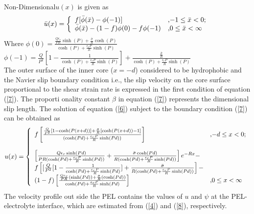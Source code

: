 \documentclass[11 pt]{article}
\begin{document}
Non-Dimensional$u(x)$ is given as
\begin{equation}
\bar u(x)=
 \left\{
                                \begin{array}{ll}
                                f[\bar \phi(\bar x)-\phi{(-1)}]  & \hbox{,$-1 \le \bar x <0$;} \\
                                 \bar \phi(\bar x)-(1-f)\phi{(0)}-f\phi{(-1)}            & \hbox{,$0 \le \bar x <\infty$} \\


\end{array}
\right.
\label{16}
\end{equation}
Where $ \phi(0)=\frac{\frac{Q\epsilon_{r}}{PR}\sinh(P)+\frac{\bar \sigma}{R}\cosh(P)}{\cosh(P)+\frac{\epsilon_{r}P}{R}\sinh(P)} $ \\
$\phi(-1)=\frac{Q}{{P}^{2}}[1-\frac{1}{\cosh(P)+\frac{\epsilon_{r}P}{R}\sinh(P)}] +\frac{\frac{\bar \sigma}{R}}{\cosh(P)+\frac{\epsilon_{r}P}{R}\sinh(P)} $ \\
The outer surface of the inner core ($x=-d$) considered to be hydrophobic  and  the Navier slip boundary condition i.e., the  slip velocity on the core surface  proportional to the shear strain rate is expressed in the first condition of equation  (\ref{7}). The proporti
onality constant $\beta$ in equation (\ref{7}) represents  the dimensional slip length. The solution of equation (\ref{6}) subject to the boundary condition (\ref{7}) can be obtained as
\begin{equation}
 u(x)=
  \left\{
\begin{array}{ll}
 f\left[\frac{\frac{Q}{{P}^{2}}[1-\cosh(P(x+d))] +\frac{\bar \sigma}{R}[\cosh(P(x+d))-1]}{(\cosh(Pd)+\frac{\epsilon_{r}P}{R}\sinh(Pd))}\right]  & \hbox{,$-d \le x <0;$} \\ \\
 \left[\frac{Q\epsilon_{r}\sinh(Pd)}{PR(\cosh(Pd)+\frac{\epsilon_{r}P}{R}\sinh(Pd))} + \frac{\bar \sigma\cosh(Pd)}{R(\cosh(Pd)+\frac{\epsilon_{r}P}{R}\sinh(Pd))}\right] e^{-Rx} -\\ f\left[[\frac{Q}{{P}^{2}}[1-\frac{1}{\cosh(Pd)+\frac{\epsilon_{r}P}{R}\sinh(Pd)}] +\frac{\bar \sigma}{R(\cosh(Pd)+\frac{\epsilon_{r}P}{R}\sinh(Pd))}\right]-\\
 (1-f)\left[\frac{\frac{Q\epsilon_{r}}{PR}(\sinh(Pd))+\frac{\bar \sigma}{R}(\cosh(Pd))}{\cosh(Pd)+\frac{\epsilon_{r}P}{R}\sinh(Pd)} \right] & \hbox{,$0 \le x <\infty$} \\
\end{array}
\right.
\label{17}
 \end{equation}
The velocity profile out side the PEL contains the  values of $u$ and $\psi$ at the PEL-electrolyte interface, which are estimated from (\ref{4}) and (\ref{8}), respectively.
\end{document}
